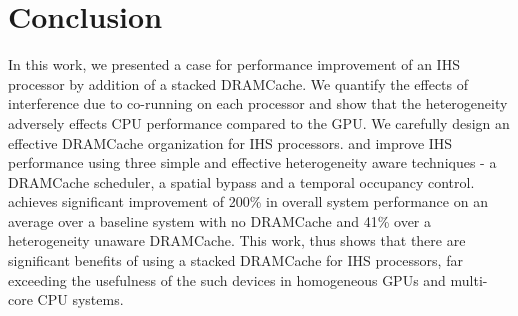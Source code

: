 \section{Conclusion} \label{conclusion}
In this work, we presented a case for performance improvement of an IHS processor by addition of a stacked DRAMCache. We quantify the effects of interference due to co-running on each processor and show that the heterogeneity adversely effects CPU performance compared to the GPU. 
We carefully design an effective DRAMCache organization for IHS processors.
and improve IHS performance using three simple and effective heterogeneity aware techniques - a DRAMCache scheduler, a spatial bypass and a temporal occupancy control. \cachename achieves significant improvement of 200\% in overall system performance on an average over a baseline system with no DRAMCache and 41\% over a heterogeneity unaware DRAMCache. This work, thus shows that there are significant benefits of using a stacked DRAMCache for IHS processors, far exceeding the usefulness of the such devices in homogeneous GPUs and multi-core CPU systems.